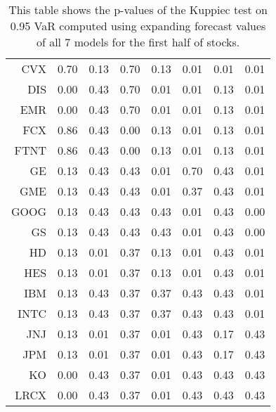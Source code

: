 \begin{table}[ht]
\begin{tabular}{rrrrrrrr}
  CVX & 0.70 & 0.13 & 0.70 & 0.13 & 0.01 & 0.01 & 0.01 \\ 
  DIS & 0.00 & 0.43 & 0.70 & 0.01 & 0.01 & 0.13 & 0.01 \\ 
  EMR & 0.00 & 0.43 & 0.70 & 0.01 & 0.01 & 0.13 & 0.01 \\ 
  FCX & 0.86 & 0.43 & 0.00 & 0.13 & 0.01 & 0.13 & 0.01 \\ 
  FTNT & 0.86 & 0.43 & 0.00 & 0.13 & 0.01 & 0.13 & 0.01 \\ 
  GE & 0.13 & 0.43 & 0.43 & 0.01 & 0.70 & 0.43 & 0.01 \\ 
  GME & 0.13 & 0.43 & 0.43 & 0.01 & 0.37 & 0.43 & 0.01 \\ 
  GOOG & 0.13 & 0.43 & 0.43 & 0.43 & 0.01 & 0.43 & 0.00 \\ 
  GS & 0.13 & 0.43 & 0.43 & 0.43 & 0.01 & 0.43 & 0.00 \\ 
  HD & 0.13 & 0.01 & 0.37 & 0.13 & 0.01 & 0.43 & 0.01 \\ 
  HES & 0.13 & 0.01 & 0.37 & 0.13 & 0.01 & 0.43 & 0.01 \\ 
  IBM & 0.13 & 0.43 & 0.37 & 0.37 & 0.43 & 0.43 & 0.01 \\ 
  INTC & 0.13 & 0.43 & 0.37 & 0.37 & 0.43 & 0.43 & 0.01 \\ 
  JNJ & 0.13 & 0.01 & 0.37 & 0.01 & 0.43 & 0.17 & 0.43 \\ 
  JPM & 0.13 & 0.01 & 0.37 & 0.01 & 0.43 & 0.17 & 0.43 \\ 
  KO & 0.00 & 0.43 & 0.37 & 0.01 & 0.43 & 0.43 & 0.43 \\ 
  LRCX & 0.00 & 0.43 & 0.37 & 0.01 & 0.43 & 0.43 & 0.43 \\ 
   \hline
\end{tabular}
\caption[Kupiec test p-values, alpha =0.95 (1)]{This table shows the p-values of the Kuppiec test on 0.95 VaR computed using expanding forecast values of all 7 models for the first half of stocks.} 
\label{Table:Kupiec_test_expanding_0.95_1}
\end{table}
